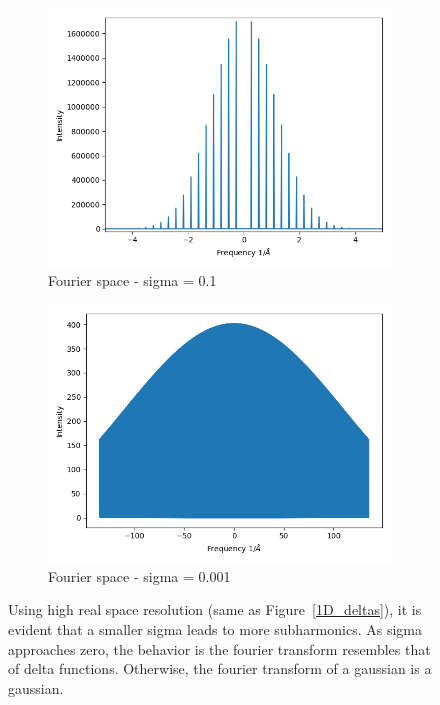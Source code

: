 \documentclass{article}
\begin{document}
\begin{figure}
\begin{subfigure}{0.33\textwidth}
                \includegraphics[width=\textwidth]{fourier_gauss_1d_medsig}
                \caption{Fourier space - sigma = 0.1}\label{fourier_gauss_1d_medsig}
        \end{subfigure}
        \begin{subfigure}{0.33\textwidth}
                \centering
                \includegraphics[width=\textwidth]{fourier_gauss_1d_lowsig}
                \caption{Fourier space - sigma = 0.001}\label{fourier_gauss_1d_lowsig}
        \end{subfigure}
	\caption{Using high real space resolution (same as Figure~\ref{1D_deltas}), it
                 is evident that a smaller sigma leads to more subharmonics. As sigma
		 approaches zero, the behavior is the fourier transform resembles that
		 of delta functions. Otherwise, the fourier transform of a gaussian is
		 a gaussian.}\label{fig:1D_gauss_sigma}
\end{figure}
\end{document}
